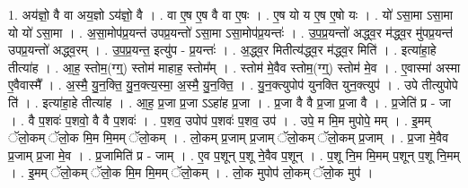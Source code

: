 \documentclass[17pt]{extarticle}
\begin{document}
1. अय॑ज्ञो॒ वै वा अय॒ज्ञो ऽय॑ज्ञो॒ वै । . वा ए॒ष ए॒ष वै वा ए॒षः । . ए॒ष यो य ए॒ष ए॒षो यः । . यो॑ ऽसा॒मा ऽसा॒मा यो यो॑ ऽसा॒मा । . अ॒सा॒मोप॑प्र॒यन्त॑ उपप्र॒यन्तो॑ ऽसा॒मा ऽसा॒मोप॑प्र॒यन्तः॑ । . उ॒प॒प्र॒यन्तो॑ अद्ध्व॒र म॑द्ध्व॒र मु॑पप्र॒यन्त॑ उपप्र॒यन्तो॑ अद्ध्व॒रम् । . उ॒प॒प्र॒यन्त॒ इत्यु॑प - प्र॒यन्तः॑ । . अ॒द्ध्व॒र मितीत्य॑द्ध्व॒र म॑द्ध्व॒र मिति॑ । . इत्या॑हा॒हे तीत्या॑ह । . आ॒ह॒ स्तोम॒(ग्ग्॒) स्तोम॑ माहाह॒ स्तोम᳚म् । . स्तोम॑ मे॒वैव स्तोम॒(ग्ग्॒) स्तोम॑ मे॒व । . ए॒वास्मा॑ अस्मा ए॒वैवास्मै᳚ । . अ॒स्मै॒ यु॒न॒क्ति॒ यु॒न॒क्त्य॒स्मा॒ अ॒स्मै॒ यु॒न॒क्ति॒ । . यु॒न॒क्त्युपोप॑ युनक्ति युन॒क्त्युप॑ । . उपे तीत्युपोपे ति॑ । . इत्या॑हा॒हे तीत्या॑ह । . आ॒ह॒ प्र॒जा प्र॒जा ऽऽहा॑ह प्र॒जा । . प्र॒जा वै वै प्र॒जा प्र॒जा वै । . प्र॒जेति॑ प्र - जा । . वै प॒शवः॑ प॒शवो॒ वै वै प॒शवः॑ । . प॒शव॒ उपोप॑ प॒शवः॑ प॒शव॒ उप॑ । . उपे॒ म मि॒म मुपोपे॒ मम् । . इ॒मम् ॅलो॒कम् ॅलो॒क मि॒म मि॒मम् ॅलो॒कम् । . लो॒कम् प्र॒जाम् प्र॒जाम् ॅलो॒कम् ॅलो॒कम् प्र॒जाम् । . प्र॒जा मे॒वैव प्र॒जाम् प्र॒जा मे॒व । . प्र॒जामिति॑ प्र - जाम् । . ए॒व प॒शून् प॒शू ने॒वैव प॒शून् । . प॒शू नि॒म मि॒मम् प॒शून् प॒शू नि॒मम् । . इ॒मम् ॅलो॒कम् ॅलो॒क मि॒म मि॒मम् ॅलो॒कम् । . लो॒क मुपोप॑ लो॒कम् ॅलो॒क मुप॑ । \newline
\end{document}
